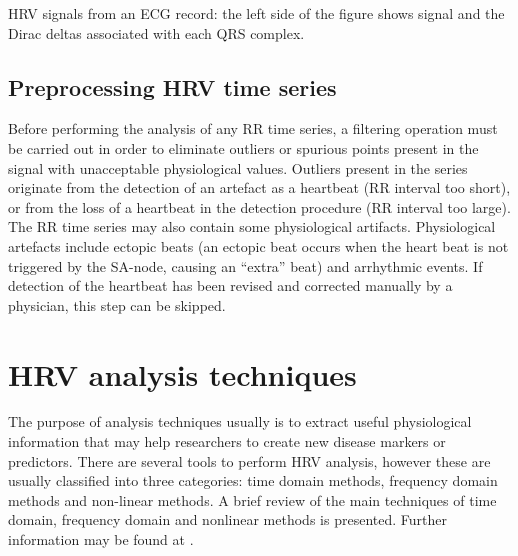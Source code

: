 \documentclass[12pt,lot, lof]{puthesis}
\begin{document}
HRV signals from an ECG record: the left side of the figure shows
signal and the Dirac deltas associated with each QRS complex. 

\subsection{Preprocessing HRV time series}

Before performing the analysis of any RR time series, a filtering operation 
must be carried out in order to eliminate outliers or spurious points present 
in the signal with
unacceptable physiological values. Outliers present in the series originate 
from the detection of an artefact as a heartbeat (RR interval too short), or 
from the loss of a heartbeat in the detection procedure (RR interval too 
large). The RR time series may also contain some physiological artifacts. 
Physiological artefacts include ectopic beats (an ectopic beat occurs when the 
heart beat is not
triggered by the SA-node, causing an ``extra'' beat) and arrhythmic events. If 
detection of the heartbeat has been revised and corrected manually by a 
physician, this step can be skipped.\\

\section{HRV analysis techniques\label{sec:analysisTechn}}
The purpose of analysis techniques usually is to extract useful physiological 
information that may help  researchers to create new disease markers or 
predictors. There are several tools to perform \gls{HRV} analysis, however 
these are usually classified into three categories: time domain methods, 
frequency domain methods and non-linear methods. A brief review of the main 
techniques of time domain, frequency domain and nonlinear methods is presented. 
Further information may be found at \cite{forceHRV}.
\end{document}
